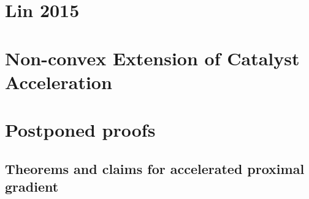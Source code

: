 \documentclass[12pt]{article}
\begin{document}
\section{Lin 2015}

\section{Non-convex Extension of Catalyst Acceleration}





\appendix
\section{Postponed proofs}

\subsection{Theorems and claims for accelerated proximal gradient}\label{app:sec:thm-claim-acc-prox-grad}

    \begin{theorem}\label{thm:fun-thm-prox-grad}
        
    \end{theorem}
    \begin{theorem}
        
    \end{theorem}
    
    
\end{document}
